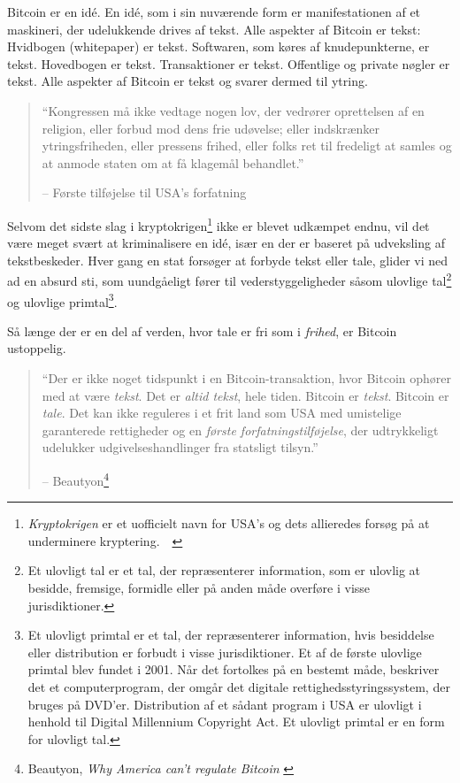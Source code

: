 \documentclass[paper=6in:9in,pagesize=pdftex,
               headinclude=on,footinclude=on,12pt]{scrbook}
\begin{document}
Bitcoin er en id\'e. En id\'e, som i sin nuværende form er manifestationen af et maskineri, der udelukkende drives af tekst. Alle aspekter af Bitcoin er tekst: Hvidbogen (whitepaper) er tekst. Softwaren, som køres af knudepunkterne, er tekst. Hovedbogen er tekst. Transaktioner er tekst. Offentlige og private nøgler er tekst. Alle aspekter af Bitcoin er tekst og svarer dermed til ytring.\begin{quotation}\begin{samepage} \enquote{Kongressen må ikke vedtage nogen lov, der vedrører oprettelsen af en religion, eller forbud mod dens frie udøvelse; eller indskrænker ytringsfriheden, eller pressens frihed, eller folks ret til fredeligt at samles og at anmode staten om at få klagemål behandlet.} \begin{flushright} -- Første tilføjelse til USA's forfatning \end{flushright}\end{samepage}\end{quotation}

Selvom det sidste slag i kryptokrigen\footnote{\textit{Kryptokrigen} er et uofficielt navn for USA's og dets allieredes forsøg på at underminere kryptering.~\cite{eff-cryptowars}~\cite{wiki:cryptowars}} ikke er blevet udkæmpet endnu, vil det være meget svært at kriminalisere en id\'e, især en der er baseret på udveksling af tekstbeskeder. Hver gang en stat forsøger at forbyde tekst eller tale, glider vi ned ad en absurd sti, som uundgåeligt fører til vederstyggeligheder såsom ulovlige tal\footnote{Et ulovligt tal er et tal, der repræsenterer information, som er ulovlig at besidde, fremsige, formidle eller på anden måde overføre i visse jurisdiktioner.\cite{wiki:illegal-number}} og ulovlige primtal\footnote{Et ulovligt primtal er et tal, der repræsenterer information, hvis besiddelse eller distribution er forbudt i visse jurisdiktioner. Et af de første ulovlige primtal blev fundet i 2001. Når det fortolkes på en bestemt måde, beskriver det et computerprogram, der omgår det digitale rettighedsstyringssystem, der bruges på DVD'er. Distribution af et sådant program i USA er ulovligt i henhold til Digital Millennium Copyright Act. Et ulovligt primtal er en form for ulovligt tal.\cite{wiki:illegal-prime}}.

Så længe der er en del af verden, hvor tale er fri som i \textit{frihed}, er Bitcoin ustoppelig.\begin{quotation}\begin{samepage} \enquote{Der er ikke noget tidspunkt i en Bitcoin-transaktion, hvor Bitcoin ophører med at være \textit{tekst}. Det er \textit{altid tekst}, hele tiden. \href{...}{} Bitcoin er \textit{tekst}. Bitcoin er \textit{tale}. Det kan ikke reguleres i et frit land som USA med umistelige garanterede rettigheder og en \textit{første forfatningstilføjelse}, der udtrykkeligt udelukker udgivelseshandlinger fra statsligt tilsyn.} \begin{flushright} -- Beautyon\footnote{Beautyon, \textit{Why America can't regulate Bitcoin} \cite{america-regulate-bitcoin}}
\end{flushright}\end{samepage}\end{quotation}
\end{document}
